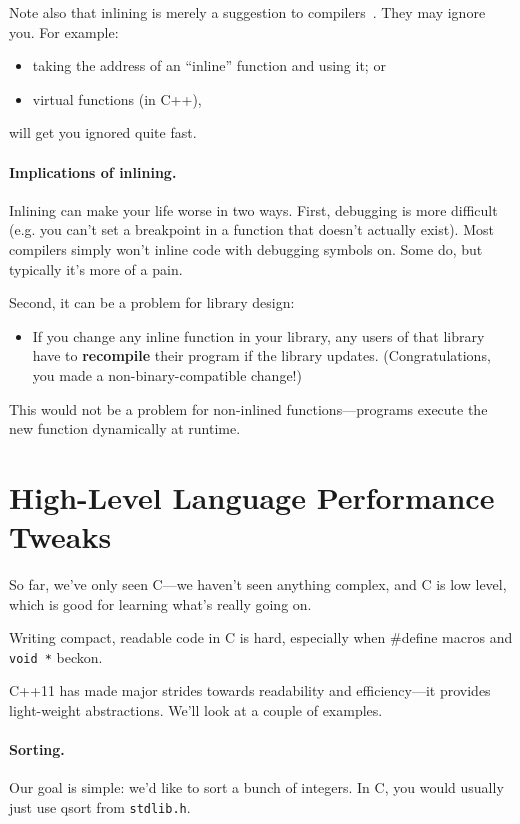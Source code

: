 \documentclass[a4paper]{report}
\begin{document}
  Note also that inlining is merely a suggestion to compilers~\cite{gcc:inlining}.
  They may ignore you.
  For example:
  \begin{itemize}
    \item taking the address of an ``inline'' function and using it; or
    \item virtual functions (in C++),
  \end{itemize}
  will get you ignored quite fast.

\paragraph{Implications of inlining.} Inlining can make your life worse in two ways.
First, debugging is more difficult (e.g. you can't set a breakpoint in a function that
  doesn't actually exist).
 Most compilers simply won't inline code with debugging symbols on.
 Some do, but typically it's more of a pain.

Second, it can be a problem for library design:
  \begin{itemize}
    \item If you change any inline function in your library, any users
      of that library have to {\bf recompile} their program if the
      library updates. (Congratulations, you made a non-binary-compatible change!)
  \end{itemize}
This would not be a problem for non-inlined functions---programs execute the new function
dynamically at runtime.

\section*{High-Level Language Performance Tweaks}
So far, we've only seen C---we haven't seen anything complex, and C is
low level, which is good for learning what's really going on.

 Writing compact, readable code in C is hard, especially when \#define
macros and {\tt void *} beckon.

    C++11 has made major strides towards readability and
    efficiency---it provides light-weight abstractions. We'll look at
    a couple of examples.

\paragraph{Sorting.} Our goal is simple: we'd like to sort a bunch of integers.
In C, you would usually just use qsort from {\tt stdlib.h}.
\end{document}
